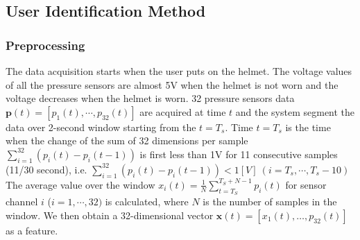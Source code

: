 \documentclass[sigchi,authordraft]{acmart}
\begin{document}
\subsection{User Identification Method}

\subsubsection{Preprocessing}
The data acquisition starts when the user puts on the helmet. The voltage values of all the pressure sensors are almost 5V when the helmet is not worn and the voltage decreases when the helmet is worn. 32 pressure sensors data $\bm{p}(t)=[p_1(t),\cdots,p_{32}(t)]$ are acquired at time $t$ and the system segment the data over 2-second window starting from the $t=T_s$. Time $t=T_s$ is the time when the change of the sum of 32 dimensions per sample $\sum_{i=1}^{32}(p_i(t)-p_i(t-1))$ is first less than 1V for 11 consecutive samples (11/30 second), i.e. $\sum_{i=1}^{32}(p_i(t)-p_i(t-1))<1[V]~(i=T_s,\cdots,T_s-10)$ The average value over the window $x_i(t)=\frac{1}{N}\sum_{t=T_S}^{T_S+N-1}p_i(t)$ for sensor channel $i$ ($i=1,\cdots,32)$ is calculated, where $N$ is the number of samples in the window. We then obtain a 32-dimensional vector $\bm{x}(t)=[x_{1}(t),\dots,p_{32}(t)]$ as a feature. 

\end{document}
